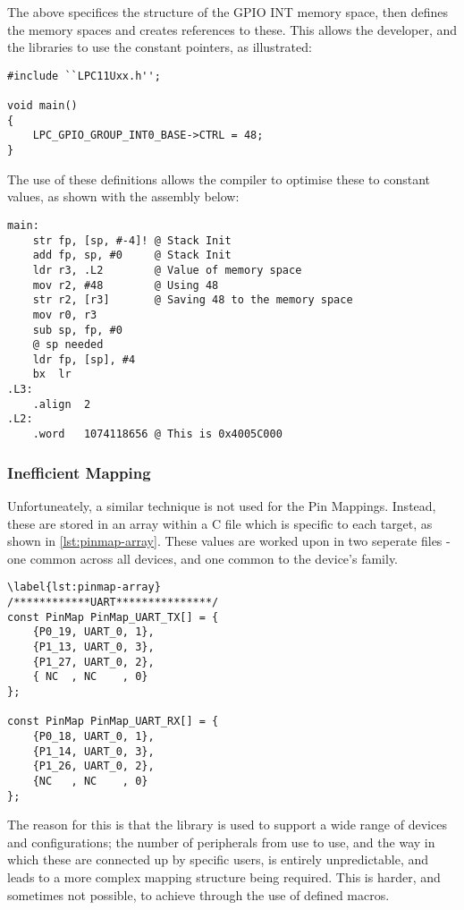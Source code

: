 The above specifices the structure of the GPIO INT memory space, then defines the memory spaces and creates references to these. This allows the developer, and the libraries to use the constant pointers, as illustrated:

\begin{lstlisting}[caption={LPC GPIO GROUP INT0 being used}]
#include ``LPC11Uxx.h'';

void main()
{
    LPC_GPIO_GROUP_INT0_BASE->CTRL = 48;
}
\end{lstlisting}

The use of these definitions allows the compiler to optimise these to constant values, as shown with the assembly below:

\begin{lstlisting}[caption={LPC GPIO GROUP INT0 converted to ASM}]
main:
    str fp, [sp, #-4]! @ Stack Init
    add fp, sp, #0     @ Stack Init
    ldr r3, .L2        @ Value of memory space
    mov r2, #48        @ Using 48
    str r2, [r3]       @ Saving 48 to the memory space
    mov r0, r3
    sub sp, fp, #0
    @ sp needed
    ldr fp, [sp], #4
    bx  lr
.L3:
    .align  2
.L2:
    .word   1074118656 @ This is 0x4005C000
\end{lstlisting}

\subsubsection{Inefficient Mapping}

Unfortuneately, a similar technique is not used for the Pin Mappings. Instead, these are stored in an array within a C file which is specific to each target, as shown in \ref{lst:pinmap-array}. These values are worked upon in two seperate files - one common across all devices, and one common to the device's family.

\begin{lstlisting}[caption={PinMap Arrays}]
\label{lst:pinmap-array}
/************UART***************/
const PinMap PinMap_UART_TX[] = {
    {P0_19, UART_0, 1},
    {P1_13, UART_0, 3},
    {P1_27, UART_0, 2},
    { NC  , NC    , 0}
};

const PinMap PinMap_UART_RX[] = {
    {P0_18, UART_0, 1},
    {P1_14, UART_0, 3},
    {P1_26, UART_0, 2},
    {NC   , NC    , 0}
};
\end{lstlisting}

The reason for this is that the library is used to support a wide range of devices and configurations; the number of peripherals from use to use, and the way in which these are connected up by specific users, is entirely unpredictable, and leads to a more complex mapping structure being required. This is harder, and sometimes not possible, to achieve through the use of defined macros.

